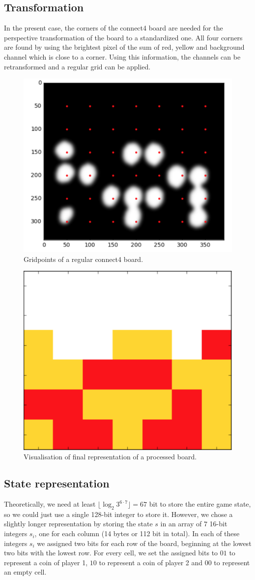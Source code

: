 \documentclass[10pt,twocolumn,letterpaper]{article}
\begin{document}
\subsection{Transformation}
In the present case, the corners of the connect4 board are needed for the perspective transformation of the board to a standardized one.
All four corners are found by using the brightest pixel of the sum of red, yellow and background channel which is close to a corner.
Using this information, the channels can be retransformed and a regular grid can be applied.
\begin{figure}[bh]
  \centering
  \includegraphics[width = .3\textwidth]{figures/grid.png}
  \caption{Gridpoints of a regular connect4 board.}
  \label{fig:grid}
\end{figure}
\begin{figure}[bh]
  \centering
  \includegraphics[width = .3\textwidth]{figures/finalBoard.png}
  \caption{Visualisation of final representation of a processed board.}
  \label{fig:final}
\end{figure}



\subsection{State representation}
Theoretically, we need at least $\lfloor \log_2 3^{6\cdot 7} \rfloor = 67$ bit to store the entire game state, so we could just use a single
128-bit integer to store it.
However, we chose a slightly longer representation by storing the state $s$ in an array of $7$ 16-bit integers $s_i$, one for each column (14 bytes or 112 bit in total).
In each of these integers $s_i$ we assigned two bits for each row of the board, beginning at the lowest two bits with the lowest row.
For every cell, we set the assigned bits to $01$ to represent a coin of player 1, $10$ to represent a coin of player 2 and $00$ to represent an empty cell.
\end{document}
